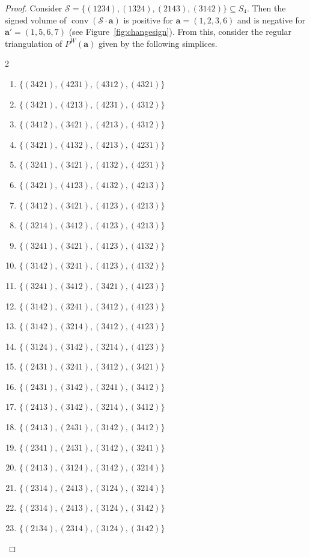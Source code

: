 \documentclass{amsart}
\theoremstyle{definition}
\def\ba{\mathbf{a}}
\def\wperm_#1{P^W(#1)}
\def\cS{\mathcal{S}}
\DeclareMathOperator{\conv}{conv}
\begin{document}
\begin{proof}

Consider $\cS=\{(1234), (1324), (2143), (3142)\} \subseteq S_4$. Then the signed volume of $\conv(\cS\cdot \ba)$ is positive for $\ba=(1,2,3,6)$ and is negative for $\ba'=(1,5,6,7)$ (see Figure~\ref{fig:changesign}). From this, consider the regular triangulation of $\wperm_\ba$ given by the following simplices.

\begin{multicols}{2}
\begin{enumerate}[label=$S_{\arabic*}$, itemsep=1pt]
    \item $\{(3421), (4231), (4312), (4321)\}$
    \item $\{(3421), (4213), (4231), (4312)\}$
    \item $\{(3412), (3421), (4213), (4312)\}$
    \item $\{(3421), (4132), (4213), (4231)\}$
    \item $\{(3241), (3421), (4132), (4231)\}$
    \item $\{(3421), (4123), (4132), (4213)\}$
    \item $\{(3412), (3421), (4123), (4213)\}$
    \item $\{(3214), (3412), (4123), (4213)\}$
    \item $\{(3241), (3421), (4123), (4132)\}$
    \item $\{(3142), (3241), (4123), (4132)\}$
    \item $\{(3241), (3412), (3421), (4123)\}$
    \item $\{(3142), (3241), (3412), (4123)\}$
    \item $\{(3142), (3214), (3412), (4123)\}$
    \item $\{(3124), (3142), (3214), (4123)\}$
    \item $\{(2431), (3241), (3412), (3421)\}$
    \item $\{(2431), (3142), (3241), (3412)\}$
    \item $\{(2413), (3142), (3214), (3412)\}$
    \item $\{(2413), (2431), (3142), (3412)\}$
    \item $\{(2341), (2431), (3142), (3241)\}$
    \item $\{(2413), (3124), (3142), (3214)\}$
    \item $\{(2314), (2413), (3124), (3214)\}$
    \item $\{(2314), (2413), (3124), (3142)\}$
    \item $\{(2134), (2314), (3124), (3142)\}$

\end{enumerate}
\end{multicols}
\end{proof}
\end{document}
